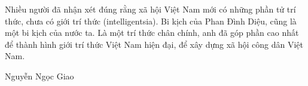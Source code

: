 Nhiều người đã nhận xét đúng rằng xã hội Việt Nam mới có những phần tử trí thức, chưa có giới trí thức (intelligentsia). Bi kịch của Phan Đình Diệu, cũng là một bi kịch của nước ta. Là một trí thức chân chính, anh đã góp phần cao nhất để thành hình giới trí thức Việt Nam hiện đại, để xây dựng xã hội công dân Việt Nam. 

Nguyễn Ngọc Giao
